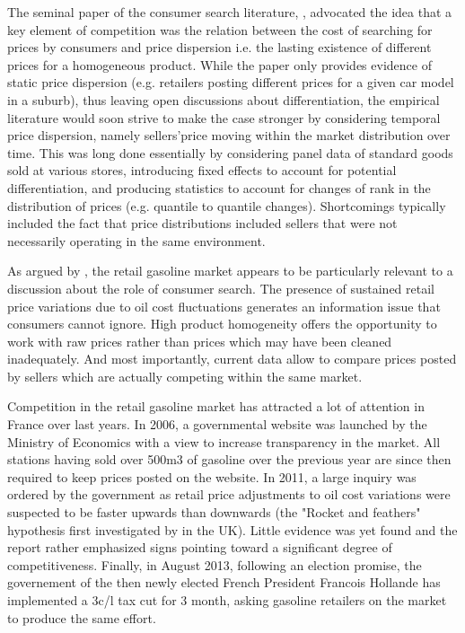 \documentclass[11pt]{article}
\begin{document}
The seminal paper of the consumer search literature, \cite{STI61}, advocated the idea that a key element of competition was the relation between the cost of searching for prices by consumers and price dispersion i.e. the lasting existence of different prices for a homogeneous product. While the paper only provides evidence of static price dispersion (e.g. retailers posting different prices for a given car model in a suburb), thus leaving open discussions about differentiation, the empirical literature would soon strive to make the case stronger by considering temporal price dispersion, namely sellers'price moving within the market distribution over time. This was long done essentially by considering panel data of standard goods sold at various stores, introducing fixed effects to account for potential differentiation, and producing statistics to account for changes of rank in the distribution of prices (e.g. quantile to quantile changes). Shortcomings typically included the fact that price distributions included sellers that were not necessarily operating in the same environment.

As argued by \cite{TAP11}, the retail gasoline market appears to be particularly relevant to a discussion about the role of consumer search. The presence of sustained retail price variations due to oil cost fluctuations generates an information issue that consumers cannot ignore. High product homogeneity offers the opportunity to work with raw prices rather than prices which may have been cleaned inadequately. And most importantly, current data allow to compare prices posted by sellers which are actually competing within the same market.

Competition in the retail gasoline market has attracted a lot of attention in France over last years. In 2006, a governmental website was launched by the Ministry of Economics with a view to increase transparency in the market. All stations having sold over 500m3 of gasoline over the previous year are since then required to keep prices posted on the website. In 2011, a large inquiry was ordered by the government as retail price adjustments to oil cost variations were suspected to be faster upwards than downwards (the "Rocket and feathers" hypothesis first investigated by \cite{BAC91} in the UK). Little evidence was yet found and the report rather emphasized signs pointing toward a significant degree of competitiveness. Finally, in August 2013, following an election promise, the governement of the then newly elected French President Francois Hollande has implemented a 3c/l tax cut for 3 month, asking gasoline retailers on the market to produce the same effort.
\end{document}

